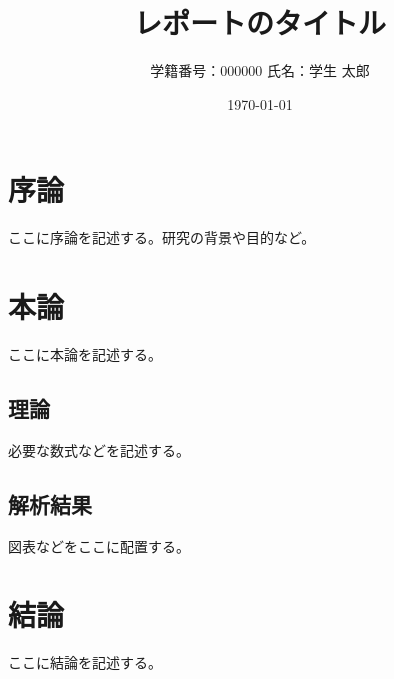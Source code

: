 \documentclass[uplatex,dvipdfmx]{jlreq}
\title{レポートのタイトル}
\author{学籍番号：000000 \quad 氏名：学生 太郎}
\date{\today}
\theoremstyle{definition}
\begin{document}
\maketitle

\tableofcontents
\clearpage

\section{序論}
ここに序論を記述する。研究の背景や目的など。

\section{本論}
ここに本論を記述する。

\subsection{理論}
必要な数式などを記述する。

\subsection{解析結果}
図表などをここに配置する。

\section{結論}
ここに結論を記述する。


%
%
\end{document}

